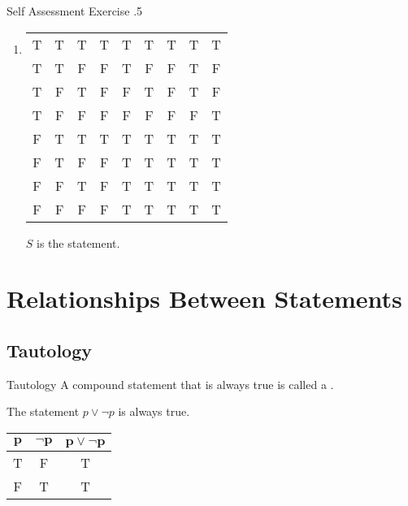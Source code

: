 \documentclass[\main/notes.tex]{subfiles}
\begin{document}
\begin{exercise}{Self Assessment Exercise \thechapter.5}
\begin{enumerate}
\begin{enumerate}
\begin{center}
\begin{tabular}{|c c c | c | c | c | c|}
										\hline
									\end{tabular}
								\end{center}
							\item {}
								\begin{center}
									\begin{tabular}{| c c c | c | c | c | c | c | c |}
										\hline
										\tablehead{$p$} & \tablehead{$q$} & \tablehead{$r$} & \tablehead{$q \land r$} & \tablehead{$p \rightarrow q$} & \tablehead{$p \rightarrow r$} & \tablehead{$p \rightarrow (q \land r)$} & \tablehead{$(p \rightarrow q) \lor (p \rightarrow r)$} & \tablehead{$S$}\\
										\hline
										T & T & T & T & T & T & T & T & T\\
										T & T & F & F & T & F & F & T & F\\
										T & F & T & F & F & T & F & T & F\\
										T & F & F & F & F & F & F & F & T\\
										F & T & T & T & T & T & T & T & T\\
										F & T & F & F & T & T & T & T & T\\
										F & F & T & F & T & T & T & T & T\\
										F & F & F & F & T & T & T & T & T\\
										\hline
									\end{tabular}
								\end{center}
								$S$ is the statement.
						\end{enumerate}
				\end{enumerate}
			\end{exercise}
			\pagebreak
		\section{Relationships Between Statements}
			\subsection{Tautology}
				\begin{definition}[width=0.7\textwidth]{Tautology}
					A compound statement that is always true is called a .
				\end{definition}
				\begin{example}[width=0.55\textwidth]
					The statement $p \lor \lnot p$ is always true.
					\begin{center}
						\begin{tabular}{| c c | c |}
							\hline
							$\mathbf{p}$ & $\mathbf{\lnot p}$ & $\mathbf{p \lor \lnot p}$\\
							\hline
							T & F & T\\
							F & T & T\\
							\hline
						\end{tabular}
					\end{center}
				\end{example}
\end{document}
